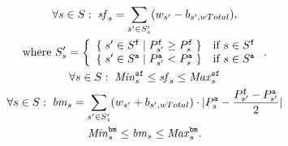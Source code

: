 \begin{gather}
\label{sf}
\forall s \in S:\;
\mi{sf}_s = \sum_{s' \in S'_s} (w_{s'} - b_{s',wTotal}),\\
\nonumber \text{where }S'_s = \left\{
\begin{array}{ll} \set{s' \in S^\trt{f}}{P^\trt{f}_{s'} \geq P^\trt{f}_s}&\text{if }s \in S^\trt{f}\\
									\set{s' \in S^\trt{a}}{P^\trt{a}_{s'} < P^\trt{a}_s}&\text{if }s \in S^\trt{a}\end{array}\right..
\\
\label{sfLim}\forall s \in S:\;
\mi{Min}^\trt{sf}_s \leq \mi{sf}_s \leq \mi{Max}^\trt{sf}_s\\
%
\label{bm}\forall s \in S:\;
\mi{bm}_s = 	\sum_{s' \in S'_s} (w_{s'} + b_{s',wTotal})\cdot |P^\trt{a}_s - \frac{P^\trt{f}_{s'}-P^\trt{a}_{s'}}{2}|\\
%
\label{bmLim}
\mi{Min}^\trt{bm}_s \leq \mi{bm}_s \leq \mi{Max}^\trt{bm}_s. 
\end{gather}

